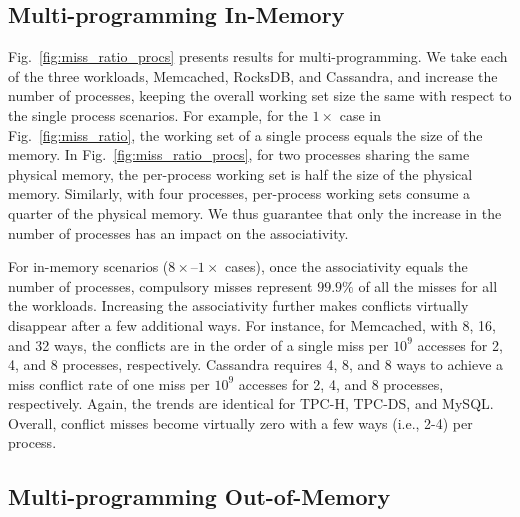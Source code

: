 \subsection{Multi-programming In-Memory}
Fig.~\ref{fig:miss_ratio_procs} presents results for multi-programming. We take each of the three workloads, Memcached, RocksDB, and Cassandra, and increase the number of processes, keeping the overall working set size the same with respect to the single process scenarios. For example, for the $1\times$ case in Fig.~\ref{fig:miss_ratio}, the working set of a single process equals the size of the memory. In Fig.~\ref{fig:miss_ratio_procs}, for two processes sharing the same physical memory, the per-process working set is half the size of the physical memory. Similarly, with four processes, per-process working sets consume a quarter of the physical memory. We thus guarantee that only the increase in the number of processes has an impact on the associativity. 

For in-memory scenarios ($8\times$--$1\times$ cases), once the associativity equals the number of processes, compulsory misses represent $99.9\%$ of all the misses for all the workloads. Increasing the associativity further makes conflicts virtually disappear after a few additional ways. For instance, for Memcached, with 8, 16, and 32 ways, the conflicts are in the order of a single miss per $10^{9}$ accesses for 2, 4, and 8 processes, respectively. Cassandra requires 4, 8, and 8 ways to achieve a miss conflict rate of one miss per $10^{9}$ accesses for 2, 4, and 8 processes, respectively. Again, the trends are identical for TPC-H, TPC-DS, and MySQL. Overall, conflict misses become virtually zero with a few ways (i.e., 2-4) per process.


\subsection{Multi-programming Out-of-Memory}

